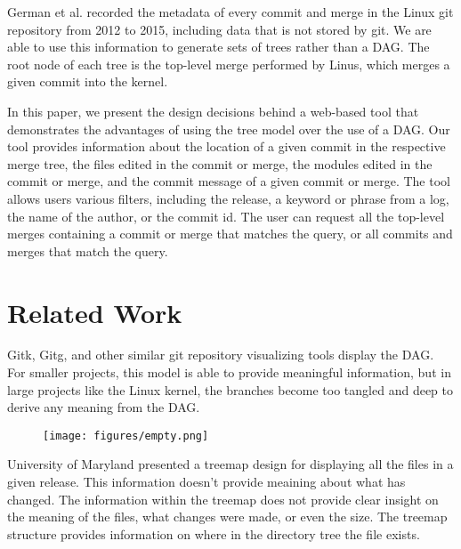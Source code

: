 \documentclass[conference, draftclsnofoot]{IEEEtran}
\begin{document}
German et al. recorded the metadata of every commit and merge in the Linux git
repository from 2012 to 2015, including data that is not stored by git. We are
able to use this information to generate sets of trees rather than a DAG. The
root node of each tree is the top-level merge performed by Linus, which merges
a given commit into the kernel.

In this paper, we present the design decisions behind a web-based tool that
demonstrates the advantages of using the tree model over the use of a DAG. Our
tool provides information about the location of a given commit in the
respective merge tree, the files edited in the commit or merge, the modules
edited in the commit or merge, and the commit message of a given commit or
merge. The tool allows users various filters, including the release, a keyword
or phrase from a log, the name of the author, or the commit id. The user can
request all the top-level merges containing a commit or merge that matches the
query, or all commits and merges that match the query.

\section{Related Work}

Gitk, Gitg, and other similar git repository visualizing tools display the DAG.
For smaller projects, this model is able to provide meaningful information, but
in large projects like the Linux kernel, the branches become too tangled and
deep to derive any meaning from the DAG.


\begin{figure}[h!]
	\centering
	\texttt{[image: figures/empty.png]}
	\caption{}
	\label{}
\end{figure}


University of Maryland presented a treemap design for displaying all the files
in a given release. This information doesn't provide meaining about what has
changed. The information within the treemap does not provide clear insight on
the meaning of the files, what changes were made, or even the size. The treemap
structure provides information on where in the directory tree the file exists.

\end{document}

